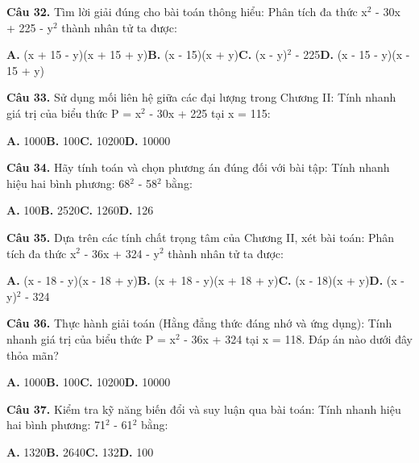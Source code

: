 \documentclass[11pt,a4paper]{article}
\begin{document}
\textbf{\color{primary} Câu 32.} Tìm lời giải đúng cho bài toán thông hiểu: Phân tích đa thức x$^2$ - 30x + 225 - y$^2$ thành nhân tử ta được:\par
\hspace*{1.5em}\textbf{A.} (x + 15 - y)(x + 15 + y)\quad\quad \textbf{B.} (x - 15)(x + y)\quad\quad \textbf{C.} (x - y)$^2$ - 225\quad\quad \textbf{D.} (x - 15 - y)(x - 15 + y)\par\vspace{2pt}
\textbf{\color{primary} Câu 33.} Sử dụng mối liên hệ giữa các đại lượng trong Chương II: Tính nhanh giá trị của biểu thức P = x$^2$ - 30x + 225 tại x = 115:\par
\hspace*{1.5em}\textbf{A.} 1000\quad\quad \textbf{B.} 100\quad\quad \textbf{C.} 10200\quad\quad \textbf{D.} 10000\par\vspace{2pt}
\textbf{\color{primary} Câu 34.} Hãy tính toán và chọn phương án đúng đối với bài tập: Tính nhanh hiệu hai bình phương: 68$^2$ - 58$^2$ bằng:\par
\hspace*{1.5em}\textbf{A.} 100\quad\quad \textbf{B.} 2520\quad\quad \textbf{C.} 1260\quad\quad \textbf{D.} 126\par\vspace{2pt}
\textbf{\color{primary} Câu 35.} Dựa trên các tính chất trọng tâm của Chương II, xét bài toán: Phân tích đa thức x$^2$ - 36x + 324 - y$^2$ thành nhân tử ta được:\par
\hspace*{1.5em}\textbf{A.} (x - 18 - y)(x - 18 + y)\quad\quad \textbf{B.} (x + 18 - y)(x + 18 + y)\quad\quad \textbf{C.} (x - 18)(x + y)\quad\quad \textbf{D.} (x - y)$^2$ - 324\par\vspace{2pt}
\textbf{\color{primary} Câu 36.} Thực hành giải toán (Hằng đẳng thức đáng nhớ và ứng dụng): Tính nhanh giá trị của biểu thức P = x$^2$ - 36x + 324 tại x = 118. Đáp án nào dưới đây thỏa mãn?\par
\hspace*{1.5em}\textbf{A.} 1000\quad\quad \textbf{B.} 100\quad\quad \textbf{C.} 10200\quad\quad \textbf{D.} 10000\par\vspace{2pt}
\textbf{\color{primary} Câu 37.} Kiểm tra kỹ năng biến đổi và suy luận qua bài toán: Tính nhanh hiệu hai bình phương: 71$^2$ - 61$^2$ bằng:\par
\hspace*{1.5em}\textbf{A.} 1320\quad\quad \textbf{B.} 2640\quad\quad \textbf{C.} 132\quad\quad \textbf{D.} 100\par\vspace{2pt}
\end{document}
